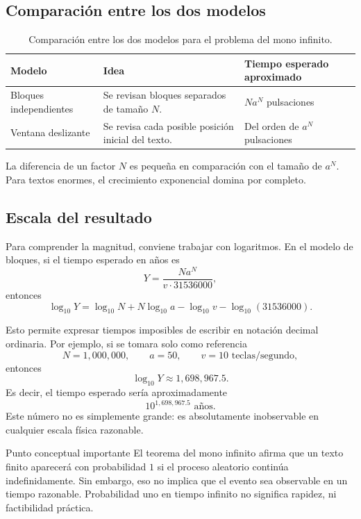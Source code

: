 \documentclass[12pt,a4paper]{article}
\theoremstyle{definition}
\begin{document}
\subsection{Comparación entre los dos modelos}

\begin{table}[H]
\centering
\renewcommand{\arraystretch}{1.25}
\begin{tabular}{L{4.2cm} L{5.5cm} L{4.2cm}}
\toprule
Modelo & Idea & Tiempo esperado aproximado \\
\midrule
Bloques independientes & Se revisan bloques separados de tamaño \(N\). & \(N a^N\) pulsaciones \\
Ventana deslizante & Se revisa cada posible posición inicial del texto. & Del orden de \(a^N\) pulsaciones \\
\bottomrule
\end{tabular}
\caption{Comparación entre los dos modelos para el problema del mono infinito.}
\end{table}

La diferencia de un factor \(N\) es pequeña en comparación con el tamaño de \(a^N\). Para textos enormes, el crecimiento exponencial domina por completo.

\subsection{Escala del resultado}

Para comprender la magnitud, conviene trabajar con logaritmos. En el modelo de bloques, si el tiempo esperado en años es
\[
    Y=\frac{N a^N}{v\cdot 31536000},
\]
entonces
\[
    \log_{10}Y
    =\log_{10}N+N\log_{10}a-\log_{10}v-\log_{10}(31536000).
\]

Esto permite expresar tiempos imposibles de escribir en notación decimal ordinaria. Por ejemplo, si se tomara solo como referencia
\[
    N=1{,}000{,}000,
    \qquad
    a=50,
    \qquad
    v=10\text{ teclas/segundo},
\]
entonces
\[
    \log_{10}Y\approx 1{,}698{,}967.5.
\]
Es decir, el tiempo esperado sería aproximadamente
\[
    10^{1{,}698{,}967.5}\text{ años}.
\]
Este número no es simplemente grande: es absolutamente inobservable en cualquier escala física razonable.

\begin{cajaAlerta}{Punto conceptual importante}
El teorema del mono infinito afirma que un texto finito aparecerá con probabilidad \(1\) si el proceso aleatorio continúa indefinidamente. Sin embargo, eso no implica que el evento sea observable en un tiempo razonable. Probabilidad uno en tiempo infinito no significa rapidez, ni factibilidad práctica.
\end{cajaAlerta}
\end{document}
